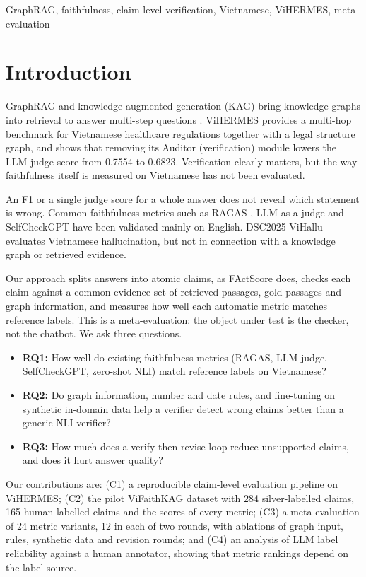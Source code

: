 \documentclass[conference]{IEEEtran}
\begin{document}
\begin{IEEEkeywords}
GraphRAG, faithfulness, claim-level verification, Vietnamese, ViHERMES, meta-evaluation
\end{IEEEkeywords}

\section{Introduction}
GraphRAG and knowledge-augmented generation (KAG) bring knowledge graphs into retrieval to answer multi-step questions \cite{kag,graphrag,lightrag,hipporag}. ViHERMES \cite{vihermes} provides a multi-hop benchmark for Vietnamese healthcare regulations together with a legal structure graph, and shows that removing its Auditor (verification) module lowers the LLM-judge score from 0.7554 to 0.6823. Verification clearly matters, but the way faithfulness itself is measured on Vietnamese has not been evaluated.

An F1 or a single judge score for a whole answer does not reveal which statement is wrong. Common faithfulness metrics such as RAGAS \cite{ragas}, LLM-as-a-judge \cite{judge} and SelfCheckGPT \cite{selfcheck} have been validated mainly on English. DSC2025 ViHallu \cite{vihallu} evaluates Vietnamese hallucination, but not in connection with a knowledge graph or retrieved evidence.

Our approach splits answers into atomic claims, as FActScore \cite{factscore} does, checks each claim against a common evidence set of retrieved passages, gold passages and graph information, and measures how well each automatic metric matches reference labels. This is a meta-evaluation: the object under test is the checker, not the chatbot. We ask three questions.

\begin{itemize}
\item \textbf{RQ1:} How well do existing faithfulness metrics (RAGAS, LLM-judge, SelfCheckGPT, zero-shot NLI) match reference labels on Vietnamese?
\item \textbf{RQ2:} Do graph information, number and date rules, and fine-tuning on synthetic in-domain data help a verifier detect wrong claims better than a generic NLI verifier?
\item \textbf{RQ3:} How much does a verify-then-revise loop reduce unsupported claims, and does it hurt answer quality?
\end{itemize}

Our contributions are: (C1) a reproducible claim-level evaluation pipeline on ViHERMES; (C2) the pilot ViFaithKAG dataset with 284 silver-labelled claims, 165 human-labelled claims and the scores of every metric; (C3) a meta-evaluation of 24 metric variants, 12 in each of two rounds, with ablations of graph input, rules, synthetic data and revision rounds; and (C4) an analysis of LLM label reliability against a human annotator, showing that metric rankings depend on the label source.
\end{document}
